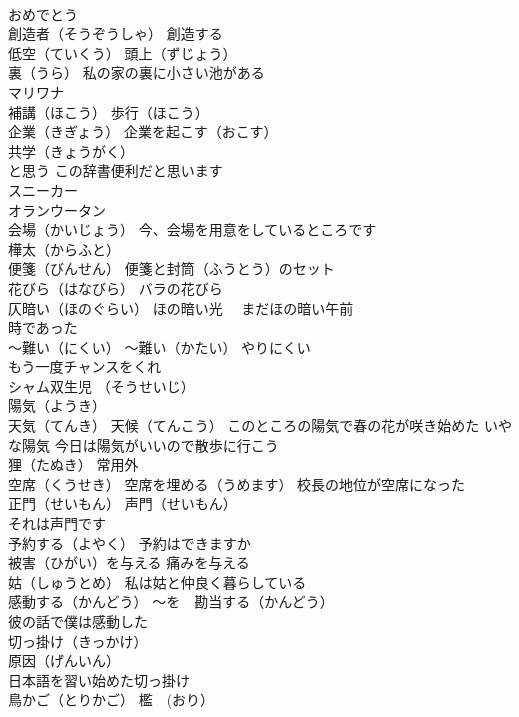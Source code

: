 \documentclass[8pt]{extreport}
\begin{document}
\begin{CJK}{UTF8}{min}
\\	おめでとう
\\	創造者（そうぞうしゃ） 創造する
\\	低空（ていくう） 頭上（ずじょう）
\\	裏（うら） 私の家の裏に小さい池がある
\\	マリワナ
\\	補講（ほこう） 歩行（ほこう）
\\	企業（きぎょう） 企業を起こす（おこす）
\\	共学（きょうがく）
\\	と思う この辞書便利だと思います
\\	スニーカー
\\	オランウータン
\\	会場（かいじょう） 今、会場を用意をしているところです
\\	樺太（からふと）
\\	便箋（びんせん） 便箋と封筒（ふうとう）のセット
\\	花びら（はなびら） バラの花びら
\\	仄暗い（ほのぐらい） ほの暗い光　 まだほの暗い午前 
\\	時であった
\\	～難い（にくい） ～難い（かたい） やりにくい
\\	もう一度チャンスをくれ
\\	シャム双生児 （そうせいじ） 
\\	陽気（ようき）
\\	天気（てんき） 天候（てんこう） このところの陽気で春の花が咲き始めた いやな陽気 今日は陽気がいいので散歩に行こう
\\	狸（たぬき） 常用外
\\	空席（くうせき） 空席を埋める（うめます） 校長の地位が空席になった
\\	正門（せいもん） 声門（せいもん）
\\	それは声門です
\\	予約する（よやく） 予約はできますか
\\	被害（ひがい）を与える 痛みを与える
\\	姑（しゅうとめ） 私は姑と仲良く暮らしている
\\	感動する（かんどう） ～を　勘当する（かんどう）
\\	彼の話で僕は感動した
\\	切っ掛け（きっかけ）
\\	原因（げんいん）
\\	日本語を習い始めた切っ掛け
\\	鳥かご（とりかご） 檻　(おり）

\end{CJK}
\end{document}
